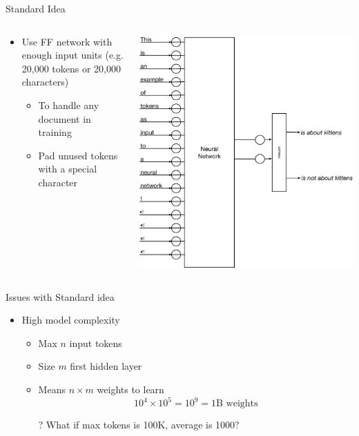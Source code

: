 \documentclass[aspectratio=169]{beamer}
\begin{document}
\begin{frame}{Standard Idea}

\begin{columns}
\begin{column}{0.5\textwidth}
\begin{itemize}
	\item Use FF network with enough input units (e.g. 20,000 tokens or 20,000 characters)
	\begin{itemize}
	\item To handle any document in training
	\item Pad unused tokens with a special character
	\end{itemize}
\end{itemize}
\end{column}
\begin{column}{0.5\textwidth}
\includegraphics[width=1\textwidth]{lectRNN/tokensV2.pdf}
\end{column}
\end{columns}
\end{frame}
\begin{frame}{Issues with Standard idea}

\begin{itemize}
	\item High model complexity
	\begin{itemize}
	\item Max $n$ input tokens
	\item Size $m$ first hidden layer
	\item Means $n \times m$ weights to learn
	$$10^4 \times 10^5 = 10^9 = 1\text{B weights}$$
	\item[?] What if max tokens is 100K, average is 1000?
	\end{itemize}
\end{itemize}
\end{frame}
\end{document}
